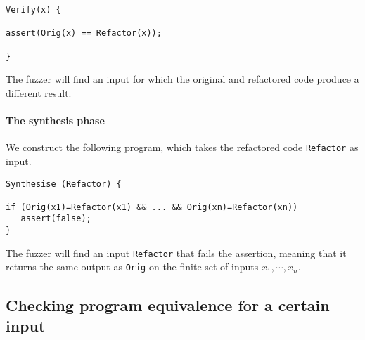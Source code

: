 \documentclass[runningheads,a4paper]{llncs}
\begin{document}
\begin{lstlisting}[mathescape=true,showstringspaces=false]
Verify(x) {

assert(Orig(x) == Refactor(x));

}
\end{lstlisting}

The fuzzer will find an input for which the original and refactored code
produce a different result.

\paragraph{The synthesis phase} We construct the following program, which
takes the refactored code \texttt{Refactor} as input.

\begin{lstlisting}[mathescape=true,showstringspaces=false]
Synthesise (Refactor) {

if (Orig(x1)=Refactor(x1) && ... && Orig(xn)=Refactor(xn))
   assert(false);
}
\end{lstlisting}

The fuzzer will find an input \texttt{Refactor} that fails the assertion,
meaning that it returns the same output as \texttt{Orig}
on the finite set of inputs \texttt{$x_1, \cdots, x_n$}.





\subsection{Checking program equivalence for a certain input}
\end{document}
